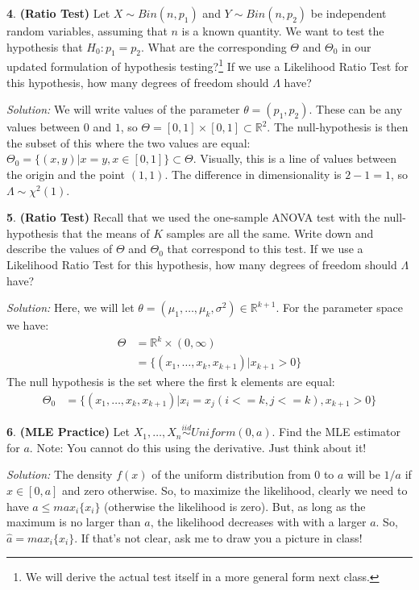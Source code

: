 \documentclass{tufte-handout}
\newcommand{\iid}{\stackrel{iid}{\sim}}
\begin{document}
\textbf{4}. \textbf{(Ratio Test)} Let $X \sim Bin(n, p_1)$ and $Y \sim Bin(n, p_2)$ be
independent random variables, assuming that $n$ is a known quantity. We want
to test the hypothesis that $H_0: p_1 = p_2$. What are the corresponding
$\Theta$ and $\Theta_0$ in
our updated formulation of hypothesis testing?\footnote{
  We will derive the actual test itself in a more general form next
  class.
} If we use a Likelihood Ratio Test for this hypothesis, how many degrees of
freedom should $\Lambda$ have?

\textit{Solution:} We will write values of the parameter $\theta = (p_1, p_2)$. These can be
any values between $0$ and $1$, so  $\Theta = [0, 1] \times [0, 1] \subset \mathbb{R}^2$.
The null-hypothesis is then the subset of this where the two values are equal:
$\Theta_0 = \{(x, y) | x = y, x \in [0, 1] \} \subset \Theta$. Visually, this 
is a line of values between the origin and the point $(1, 1)$. The difference
in dimensionality is $2 - 1 = 1$, so $\Lambda \sim \chi^2(1)$.

\textbf{5}. \textbf{(Ratio Test)} Recall that we used the one-sample ANOVA test with the
null-hypothesis that the means of $K$ samples are all the same. Write down and
describe the values of $\Theta$ and $\Theta_0$ that correspond to this test. 
If we use a Likelihood Ratio Test for this hypothesis, how many degrees of
freedom should $\Lambda$ have?

\textit{Solution:} Here, we will let $\theta = (\mu_1, \ldots, \mu_k, \sigma^2) \in \mathbb{R}^{k+1}$.
For the parameter space we have:
\begin{align*}
\Theta &= \mathbb{R}^k \times (0, \infty) \\
&= \{ (x_1, \ldots, x_k, x_{k+1}) | x_{k+1} > 0 \}
\end{align*}
The null hypothesis is the set where the first k elements are equal:
\begin{align*}
\Theta_0 &= \{ (x_1, \ldots, x_k, x_{k+1}) | x_{i} = x_{j} (i <= k, j <=k), x_{k+1} > 0 \}
\end{align*}

\textbf{6}. \textbf{(MLE Practice)} Let $X_1, \ldots, X_n \iid Uniform(0, a)$. Find the MLE
estimator for $a$. Note: You cannot do this using the derivative. Just think about it!

\textit{Solution:} The density $f(x)$ of the uniform distribution from $0$ to $a$ will be $1/a$ if 
$x \in [0, a]$ and zero otherwise. So, to maximize the likelihood, clearly we need
to have $a \leq max_i \{x_i\}$ (otherwise the likelihood is zero). But, as long as the
maximum is no larger than $a$, the likelihood decreases with with a larger $a$. So,
$\hat{a} = max_i \{x_i\}$. If that's not clear, ask me to draw you a picture in class!
\end{document}

